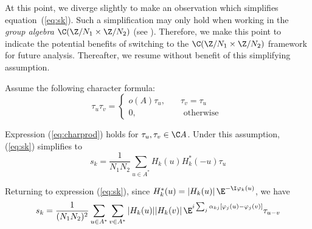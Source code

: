 \begin{center}\setlength{\fboxsep}{4mm}\begin{boxedminipage}[t]{16cm}
\begin{remark} 
{\small At this point, we diverge slightly to make an observation which
simplifies equation~(\ref{eq:sk}).  Such a simplification may
only hold when working in the \emph{group algebra} $\C(\Z/N_1 \times \Z/N_2)$
(see \cite{An:2003}).  Therefore, we make this point to indicate the
potential benefits of switching to the $\C(\Z/N_1 \times \Z/N_2)$ framework
for future analysis.  Thereafter, we resume without benefit of this
simplifying assumption.

Assume the following character formula:
\begin{equation}\label{eq:charprod}
\tau_u\tau_v = \left\{ \begin{array}{ll} o(A)\tau_u, &\quad \tau_v = \tau_u\\
                                         0, &\quad \text{ otherwise }
                       \end{array}\right.
\end{equation}

Expression (\ref{eq:charprod}) holds for $\tau_u, \tau_v \in \C A$.
Under this assumption, (\ref{eq:sk}) simplifies to
\[
s_k = \frac{1}{N_1N_2}\sum_{u\in A^*} H_k(u)H_k^*(-u)\tau_{u}
\]}
\end{remark}
\end{boxedminipage}\end{center}

Returning to expression (\ref{eq:sk}), since $H_k^*(u) =
|H_k(u)|\,\E^{-\I \varphi_k(u)}$, we have 
\begin{equation}\label{eq:m7}
s_k = 
\frac{1}{(N_1N_2)^2} \sum_{u\in A^*} \sum_{v\in A^*} |H_k(u)||H_k(v)|
\,\E^{ i\sum_j \alpha_{kj}[\varphi_j(u)-\varphi_j(v)]}\tau_{u-v}
\end{equation}

